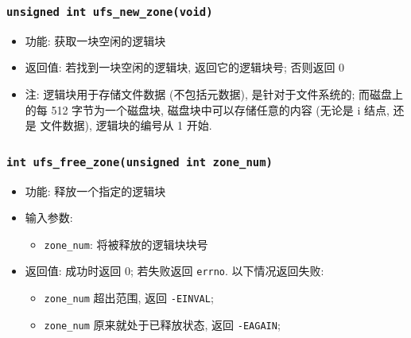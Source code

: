 \documentclass[nofonts]{ctexart}
\begin{document}
  \subsubsection[\texttt{ufs\_new\_zone}]{\texttt{unsigned int ufs\_new\_zone(void)}}
  \begin{itemize}
\item
  功能: 获取一块空闲的逻辑块
\item
  返回值: 若找到一块空闲的逻辑块, 返回它的逻辑块号; 否则返回 0
\item
  注: 逻辑块用于存储文件数据 (不包括元数据), 是针对于文件系统的;
  而磁盘上 的每 512 字节为一个磁盘块, 磁盘块中可以存储任意的内容 (无论是
  i 结点, 还是 文件数据), 逻辑块的编号从 1 开始.
  \end{itemize}
  \subsubsection[\texttt{ufs\_free\_zone}]{\texttt{int ufs\_free\_zone(unsigned int zone\_num)}}
  \begin{itemize}
\item
  功能: 释放一个指定的逻辑块
\item
  输入参数:

  \begin{itemize}
  \item
    \texttt{zone\_num}: 将被释放的逻辑块块号
  \end{itemize}
\item
  返回值: 成功时返回 0; 若失败返回 \texttt{errno}. 以下情况返回失败:

  \begin{itemize}
  \item
    \texttt{zone\_num} 超出范围, 返回 \texttt{-EINVAL};
  \item
    \texttt{zone\_num} 原来就处于已释放状态, 返回 \texttt{-EAGAIN};
  \end{itemize}
  \end{itemize}
\end{document}
